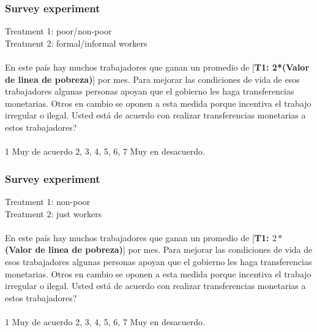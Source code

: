 \documentclass{beamer}\usepackage[]{graphicx}\usepackage[]{color}
\begin{document}
\begin{frame}\frametitle{Survey experiment}

Treatment 1: poor/non-poor~\\
Treatment 2: formal/informal workers~\\~\\


En este pa\'is hay muchos trabajadores que ganan un promedio de [\textbf{T1: 2*(Valor de linea de pobreza)}] por mes. Para mejorar las condiciones de vida de esos trabajadores algunas personas apoyan que el gobierno les haga transferencias monetarias. Otros en cambio se oponen a esta medida porque incentiva el trabajo irregular o ilegal. Usted est\'a de acuerdo con realizar transferencias monetarias a estos trabajadores?~\\~\\


1 Muy de acuerdo 2, 3, 4, 5, 6, 7 Muy en desacuerdo.

\end{frame}
\begin{frame}\frametitle{Survey experiment}

Treatment 1: non-poor~\\
Treatment 2: just workers~\\~\\


En este pa\'is hay muchos trabajadores que ganan un promedio de [\textbf{T1: $2 *$ (Valor de linea de pobreza)}] por mes. Para mejorar las condiciones de vida de esos trabajadores algunas personas apoyan que el gobierno les haga transferencias monetarias. Otros en cambio se oponen a esta medida porque incentiva el trabajo irregular o ilegal. Usted est\'a de acuerdo con realizar transferencias monetarias a estos trabajadores?~\\~\\


1 Muy de acuerdo 2, 3, 4, 5, 6, 7 Muy en desacuerdo.

\end{frame}
\end{document}
